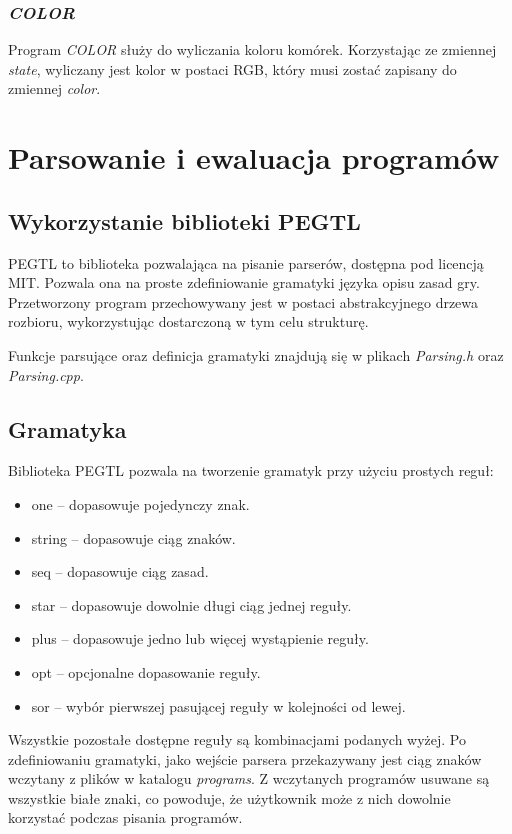 \documentclass[declaration,shortabstract, inz]{iithesis}
\theoremstyle{definition} \newtheorem{definition}{Definicja}[]
\theoremstyle{plain} \newtheorem{remark}[definition]{Obserwacja}
\theoremstyle{plain} \newtheorem{theorem}[definition]{Twierdzenie}
\theoremstyle{plain} \newtheorem{example}{Przykład}[definition]
\theoremstyle{plain} \newtheorem{lemma}[definition]{Lemat}
\begin{document}
\subsection{\textit{COLOR}}
Program \textit{COLOR} służy do wyliczania koloru komórek. Korzystając ze zmiennej \textit{state}, wyliczany jest kolor w postaci RGB, który musi zostać zapisany do zmiennej \textit{color}. 

\chapter{Parsowanie i ewaluacja programów}

\section{Wykorzystanie biblioteki PEGTL}
PEGTL to biblioteka pozwalająca na pisanie parserów, dostępna pod licencją MIT. Pozwala ona na proste zdefiniowanie gramatyki języka opisu zasad gry. Przetworzony program przechowywany jest w postaci abstrakcyjnego drzewa rozbioru, wykorzystując dostarczoną w tym celu strukturę. 

Funkcje parsujące oraz definicja gramatyki znajdują się w plikach \textit{Parsing.h} oraz \textit{Parsing.cpp}. 

\section{Gramatyka}

Biblioteka PEGTL pozwala na tworzenie gramatyk przy użyciu prostych reguł:
\begin{itemize}
\item one -- dopasowuje pojedynczy znak.
\item string -- dopasowuje ciąg znaków.
\item seq  -- dopasowuje ciąg zasad.
\item star -- dopasowuje dowolnie długi ciąg jednej reguły.
\item plus -- dopasowuje jedno lub więcej wystąpienie reguły.
\item opt  -- opcjonalne dopasowanie reguły.
\item sor -- wybór pierwszej pasującej reguły w kolejności od lewej.
\end{itemize}

Wszystkie pozostałe dostępne reguły są kombinacjami podanych wyżej. Po zdefiniowaniu gramatyki, jako wejście parsera przekazywany jest ciąg znaków wczytany z plików w katalogu \textit{programs}. Z wczytanych programów usuwane są wszystkie białe znaki, co powoduje, że użytkownik może z nich dowolnie korzystać podczas pisania programów.
\end{document}
